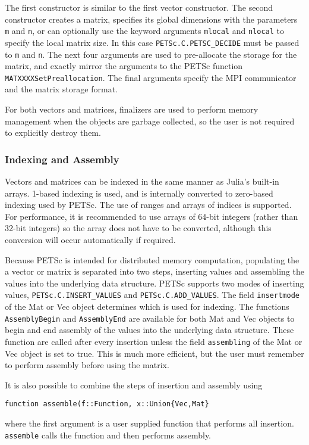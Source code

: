 \documentclass{article}
\newcommand{\ttt}{\texttt}
\begin{document}
The first constructor is similar to the first vector constructor.
The second constructor creates a matrix, specifies its global dimensions with the parameters \ttt{m} and \ttt{n}, or can optionally use the keyword arguments \ttt{mlocal} and \ttt{nlocal} to specify the local matrix size.
In this case \ttt{PETSc.C.PETSC\_DECIDE} must be passed to \ttt{m} and \ttt{n}.
The next four arguments are used to pre-allocate the storage for the matrix, and exactly mirror the arguments to the PETSc function \ttt{MATXXXXSetPreallocation}.
The final arguments specify the MPI communicator and the matrix storage format.

For both vectors and matrices, finalizers are used to perform memory management when the objects are garbage collected, so the user is not required to explicitly destroy them.

\subsubsection{Indexing and Assembly}
Vectors and matrices can be indexed in the same manner as Julia's built-in arrays.
1-based indexing is used, and is internally converted to zero-based indexing used by PETSc.
The use of ranges and arrays of indices is supported.
For performance, it is recommended to use arrays of 64-bit integers (rather than 32-bit integers) so the array does not have to be converted, although this conversion will occur automatically if required.

Because PETSc is intended for distributed memory computation, populating the a vector or matrix is separated into two steps, inserting values and assembling the values into the underlying data structure.
PETSc supports two modes of inserting values, \ttt{PETSc.C.INSERT\_VALUES} and \ttt{PETSc.C.ADD\_VALUES}.
The field \ttt{insertmode} of the Mat or Vec object  determines which is used for indexing.
The functions \ttt{AssemblyBegin} and \ttt{AssemblyEnd} are available for both Mat and Vec objects to begin and end assembly of the values into the underlying data structure.
These function are called after every insertion unless the field \ttt{assembling} of the Mat or Vec object is set to true.
This is much more efficient, but the user must remember to perform assembly before using the matrix.

It is also possible to combine the steps of insertion and assembly using
\begin{verbatim}
function assemble(f::Function, x::Union{Vec,Mat}
\end{verbatim}
where the first argument is a user supplied function that performs all insertion.
\ttt{assemble} calls the function and then performs assembly.
\end{document}
